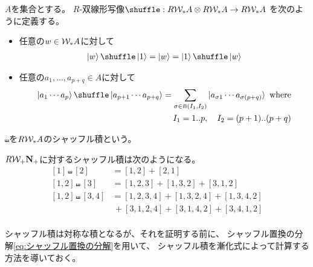 {	\begin{definition}[シャッフル積]\label{def:シャッフル積} %
		$A$を集合とする。
		$R$-双線形写像$\shuffle:R\W_*A\otimes R\W_*A\to R\W_*A$
		を次のように定義する。
		\begin{itemize}\setlength{\itemsep}{-1mm} %
			\item 任意の$w\in {\ensuremath{{\mathcal{W}}}}_*A$に対して
			\begin{equation*}\begin{split}
				\ket{w}\shuffle\ket{1} = \ket{w} = \ket{1}\shuffle\ket{w}
			\end{split}\end{equation*}
			\item 任意の$a_1,\dots,a_{p+q}\in A$に対して
			\begin{equation*}\begin{split}
				\ket{a_1\cdots a_p}\shuffle\ket{a_{p+1}\cdots a_{p+q}}
				= \sum_{\sigma\in\Cap(I_1,I_2)} 
				\ket{a_{\sigma1}\cdots a_{\sigma(p+q)}} \text{ where} \\
				I_1=1..p,\quad I_2=(p+1)..(p+q)
			\end{split}\end{equation*}
		\end{itemize} %
		$\shuffle$を$R{{\mathcal{W}}}_*A$のシャッフル積という。
	\end{definition} %

	$R{{\mathcal{W}}}_+\mathbf{N}_+$に対するシャッフル積は次のようになる。
	\begin{equation*}\begin{split}
		[1]\shuffle[2] &= [1,2] + [2,1] \\
		[1,2]\shuffle[3] &= [1,2,3] + [1,3,2] + [3,1,2] \\
		[1,2]\shuffle[3,4] &= [1,2,3,4] + [1,3,2,4] + [1,3,4,2] \\
			&\, + [3,1,2,4] + [3,1,4,2] + [3,4,1,2] \\
	\end{split}\end{equation*}

	シャッフル積は対称な積となるが、それを証明する前に、
	シャッフル置換の分解\eqref{eq:シャッフル置換の分解}を用いて、
	シャッフル積を漸化式によって計算する方法を導いておく。

}
